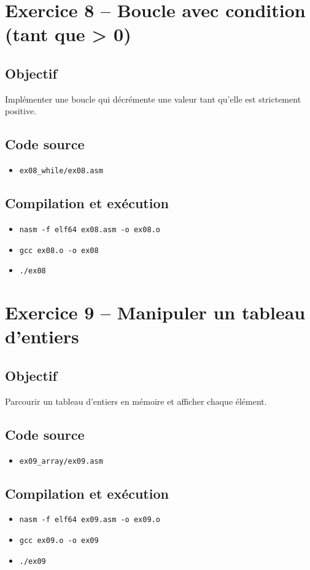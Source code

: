 \documentclass[11pt]{article}
\begin{document}
\section{Exercice 8 -- Boucle avec condition (tant que > 0)}
\subsection*{Objectif}
Implémenter une boucle qui décrémente une valeur tant qu'elle est strictement positive.

\subsection*{Code source}
\begin{itemize}[noitemsep]
    \item \texttt{ex08\_while/ex08.asm}
\end{itemize}

\subsection*{Compilation et exécution}
\begin{itemize}[noitemsep]
    \item \texttt{nasm -f elf64 ex08.asm -o ex08.o}
    \item \texttt{gcc ex08.o -o ex08}
    \item \texttt{./ex08}
\end{itemize}

\section{Exercice 9 -- Manipuler un tableau d'entiers}
\subsection*{Objectif}
Parcourir un tableau d'entiers en mémoire et afficher chaque élément.

\subsection*{Code source}
\begin{itemize}[noitemsep]
    \item \texttt{ex09\_array/ex09.asm}
\end{itemize}

\subsection*{Compilation et exécution}
\begin{itemize}[noitemsep]
    \item \texttt{nasm -f elf64 ex09.asm -o ex09.o}
    \item \texttt{gcc ex09.o -o ex09}
    \item \texttt{./ex09}
\end{itemize}
\end{document}
